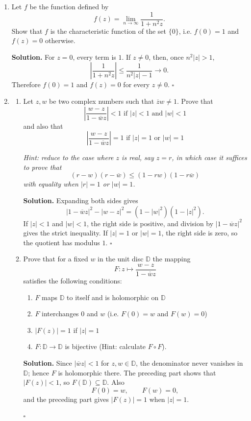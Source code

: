 \documentclass[12pt, reqno]{amsart}
\theoremstyle{definition}
\newenvironment{solution}{\par\smallskip\noindent\textbf{Solution.}}{\hfill$\square$\par\medskip}
\numberwithin{equation}{subsection}
\newcommand{\rr}{\rightarrow}
\numberwithin{equation}{section}
\begin{document}
\begin{enumerate}
\item Let $f$ be the function defined by $$ f(z) = \lim_{ n \rr \infty} \frac{1}{1 + n^2 z} .$$
 Show that $f$ is the characteristic function of the set $\{ 0 \}$, i.e. $f(0)=1$ and $f(z)=0$ otherwise.
\begin{solution}
For $z=0$, every term is $1$.  If $z\neq0$, then, once $n^2|z|>1$,
\[\left|\frac1{1+n^2z}\right|\leq\frac1{n^2|z|-1}\longrightarrow0.\]
Therefore $f(0)=1$ and $f(z)=0$ for every $z\neq0$.
\end{solution}

 \item \begin{enumerate}
\item Let $z, w$ be two complex numbers such that $\overline{z} w \neq 1$. Prove that $$ \left| \frac{w -z }{1 - \overline{w} z} \right| < 1 \text{ if } |z| < 1 \text{ and } |w| < 1 $$ and also that $$ \left| \frac{w -z }{1 - \overline{w} z} \right| = 1 \text{ if } |z| = 1 \text{ or } |w| = 1 $$

\emph{Hint: reduce to the case where $z$ is real, say $z=r$, in which case it suffices to prove that $$ (r - w) (r - \overline{w}) \leq ( 1- rw) (1 - r \overline{w}) $$ with equality when $|r|=1$ or $|w|=1$.}

\begin{solution}
Expanding both sides gives
\[
|1-\overline wz|^2-|w-z|^2=(1-|w|^2)(1-|z|^2).
\]
If $|z|<1$ and $|w|<1$, the right side is positive, and division by
$|1-\overline wz|^2$ gives the strict inequality.  If $|z|=1$ or
$|w|=1$, the right side is zero, so the quotient has modulus $1$.
\end{solution}

\item Prove that for a fixed $w$ in the unit disc $\mathbb{D}$ the mapping $$ F: z \mapsto \frac{w - z}{1 - \overline{w} z} $$ satisfies the following conditions:

\begin{enumerate}
\item $F$ maps $\mathbb{D}$ to itself and is holomorphic on $\mathbb{D}$
\item $F$ interchanges $0$ and $w$ (i.e. $F(0)=w$ and $F(w)=0$)
\item $|F(z)|=1$ if $|z|=1$
\item $F: \mathbb{D} \rr \mathbb{D}$ is bijective (Hint: calculate $F \circ F$).
\end{enumerate}

\begin{solution}
Since $|\overline wz|<1$ for $z,w\in\mathbb D$, the denominator never
vanishes in $\mathbb D$; hence $F$ is holomorphic there.  The preceding
part shows that $|F(z)|<1$, so $F(\mathbb D)\subseteq\mathbb D$.  Also
\[F(0)=w,\qquad F(w)=0,\]
and the preceding part gives $|F(z)|=1$ when $|z|=1$.


\end{solution}
\end{enumerate}
\end{enumerate}
\end{document}
